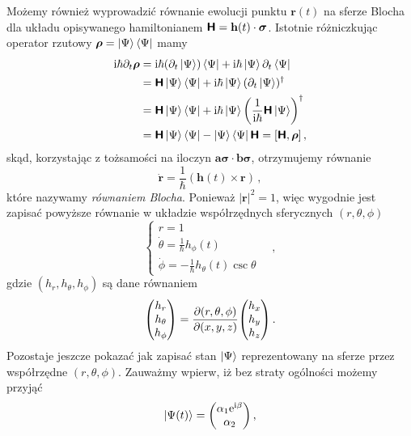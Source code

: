 \documentclass{myclass}
\begin{document}
Możemy również wyprowadzić równanie ewolucji punktu \(\mathbf{r}(t)\) na sferze Blocha dla układu
opisywanego hamiltonianem \(\boldsymbol{\mathsf{H}} = \mathbf{h}(t)\cdot\boldsymbol{\sigma}\). Istotnie
różniczkując operator rzutowy \(\boldsymbol{\mathsf{\rho}} = \ket{\Psi}\bra{\Psi}\) mamy
\begin{equation*}
    \begin{split}
        \mathrm{i}\hbar\partial_t\boldsymbol{\mathsf{\rho}} &= \mathrm{i}\hbar(\partial_t\ket{\Psi})\bra{\Psi} + \mathrm{i}\hbar\ket{\Psi}\partial_t\bra{\Psi} \\
        &= \boldsymbol{\mathsf{H}}\ket{\Psi}\bra{\Psi} + \mathrm{i}\hbar\ket{\Psi}(\partial_t\ket{\Psi})^\dagger\\
        &= \boldsymbol{\mathsf{H}}\ket{\Psi}\bra{\Psi} + \mathrm{i}\hbar\ket{\Psi}\left(\frac{1}{\mathrm{i}\hbar}\boldsymbol{\mathsf{H}}\ket{\Psi}\right)^\dagger\\
        &= \boldsymbol{\mathsf{H}}\ket{\Psi}\bra{\Psi} - \ket{\Psi}\bra{\Psi}\boldsymbol{\mathsf{H}} = [\boldsymbol{\mathsf{H}},\boldsymbol{\mathsf{\rho}}]\,,
    \end{split}
\end{equation*}
skąd, korzystając z tożsamości na iloczyn
\(\mathbf{a}\boldsymbol{\sigma}\cdot\mathbf{b}\boldsymbol{\sigma}\), otrzymujemy równanie
\begin{equation*}
    \dot{\mathbf{r}} = \frac{1}{\hbar}(\mathbf{h}(t) \times \mathbf{r})\,,
\end{equation*}
które nazywamy \textit{równaniem Blocha}. Ponieważ \(|\mathbf{r}|^2 = 1\), więc wygodnie jest
zapisać powyższe równanie w układzie współrzędnych sferycznych \((r,\theta,\phi)\)
\begin{equation*}
    \begin{cases}
        r = 1\\
        \dot{\theta} = \frac{1}{\hbar}h_\phi(t)\\
        \dot{\phi} = -\frac{1}{\hbar}h_\theta(t)\csc\theta
    \end{cases}\quad,
\end{equation*}
gdzie \((h_r,h_\theta,h_\phi)\) są dane równaniem
\begin{equation*}
    \mqty(h_r\\h_\theta\\h_\phi) = \frac{\partial(r,\theta,\phi)}{\partial(x,y,z)}\mqty(h_x \\ h_y\\h_z)\,.
\end{equation*}
Pozostaje jeszcze pokazać jak zapisać stan \(\ket{\Psi}\) reprezentowany na sferze przez współrzędne
\((r,\theta,\phi)\). Zauważmy wpierw, iż bez straty ogólności możemy przyjąć
\begin{equation*}
    \ket{\Psi(t)} = \mqty(\alpha_1\e^{\im\beta} \\ \alpha_2)\,,
\end{equation*}
\end{document}
